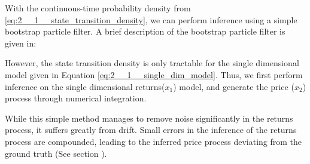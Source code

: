 \documentclass[../main.tex]{subfiles}
\begin{document}
	
With the continuous-time probability density from \autoref{eq:2__1__state_transition_density}, we can perform inference using a simple bootstrap particle filter. A brief description of the bootstrap particle filter is given in: 

However, the state transition density is only tractable for the single dimensional model given in Equation \autoref{eq:2__1__single_dim_model}. Thus, we first perform inference on the single dimensional returns($x_1$) model, and generate the price ($x_2$) process through numerical integration. 

While this simple method manages to remove noise significantly in the returns process, it suffers greatly from drift. Small errors in the inference of the returns process are compounded, leading to the inferred price process deviating from the ground truth (See section ).
\end{document}
